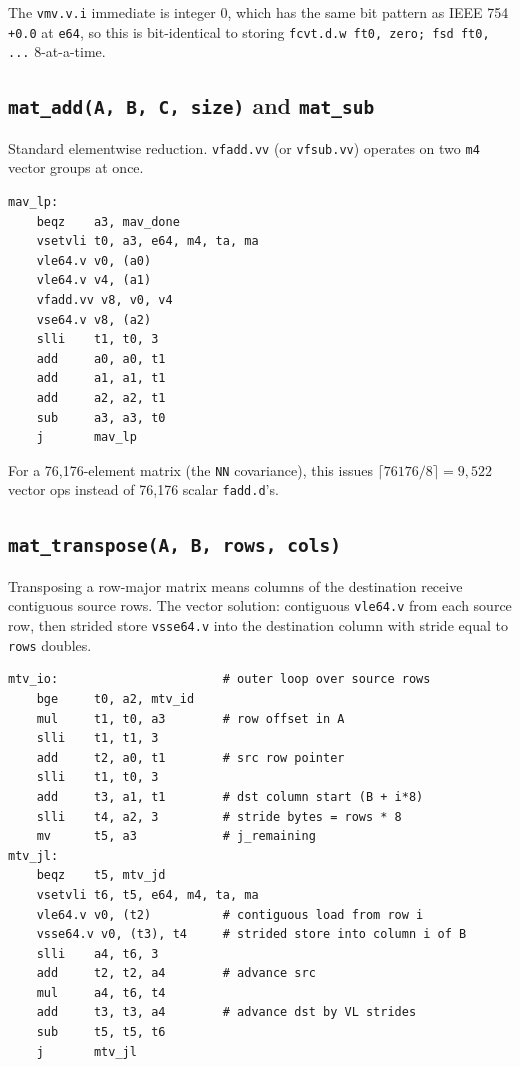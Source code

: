 \documentclass[11pt,a4paper]{article}
\begin{document}
The \texttt{vmv.v.i} immediate is integer 0, which has the same bit pattern
as IEEE 754 \texttt{+0.0} at \texttt{e64}, so this is bit-identical to
storing \texttt{fcvt.d.w ft0, zero; fsd ft0, ...} 8-at-a-time.

\subsection{\texttt{mat\_add(A, B, C, size)} and \texttt{mat\_sub}}

Standard elementwise reduction. \texttt{vfadd.vv} (or \texttt{vfsub.vv})
operates on two \texttt{m4} vector groups at once.

\begin{lstlisting}[caption={Vectorised mat\_add inner loop}]
mav_lp:
    beqz    a3, mav_done
    vsetvli t0, a3, e64, m4, ta, ma
    vle64.v v0, (a0)
    vle64.v v4, (a1)
    vfadd.vv v8, v0, v4
    vse64.v v8, (a2)
    slli    t1, t0, 3
    add     a0, a0, t1
    add     a1, a1, t1
    add     a2, a2, t1
    sub     a3, a3, t0
    j       mav_lp
\end{lstlisting}

For a 76{,}176-element matrix (the \texttt{NN} covariance), this issues
$\lceil 76176/8 \rceil = 9{,}522$ vector ops instead of 76{,}176 scalar
\texttt{fadd.d}'s.

\subsection{\texttt{mat\_transpose(A, B, rows, cols)}}

Transposing a row-major matrix means columns of the destination receive
contiguous source rows. The vector solution: contiguous \texttt{vle64.v}
from each source row, then strided store \texttt{vsse64.v} into the
destination column with stride equal to \texttt{rows} doubles.

\begin{lstlisting}[caption={Vectorised mat\_transpose --- contiguous load, strided store}]
mtv_io:                       # outer loop over source rows
    bge     t0, a2, mtv_id
    mul     t1, t0, a3        # row offset in A
    slli    t1, t1, 3
    add     t2, a0, t1        # src row pointer
    slli    t1, t0, 3
    add     t3, a1, t1        # dst column start (B + i*8)
    slli    t4, a2, 3         # stride bytes = rows * 8
    mv      t5, a3            # j_remaining
mtv_jl:
    beqz    t5, mtv_jd
    vsetvli t6, t5, e64, m4, ta, ma
    vle64.v v0, (t2)          # contiguous load from row i
    vsse64.v v0, (t3), t4     # strided store into column i of B
    slli    a4, t6, 3
    add     t2, t2, a4        # advance src
    mul     a4, t6, t4
    add     t3, t3, a4        # advance dst by VL strides
    sub     t5, t5, t6
    j       mtv_jl
\end{lstlisting}
\end{document}
